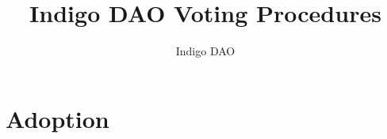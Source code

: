 \documentclass{article}
\title{Indigo DAO Voting Procedures}
\author{Indigo DAO}
\date{}
\begin{document}
\begin{sloppypar}

\renewcommand*\contentsname{Table of Contents}

\maketitle

\tableofcontents

\hypertarget{adoption}{%
\section{Adoption}\label{adoption}}



\end{sloppypar}
\end{document}
